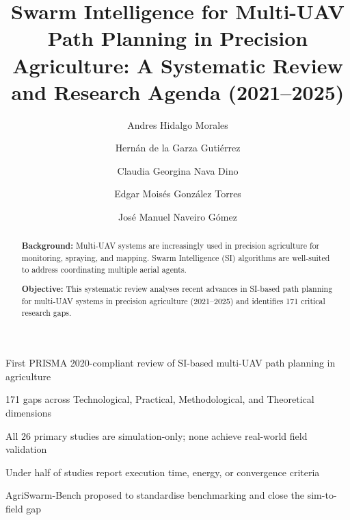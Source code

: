 \documentclass[review,3p,times]{elsarticle}
\begin{document}
\begin{frontmatter}
\title{Swarm Intelligence for Multi-UAV Path Planning in Precision Agriculture: A Systematic Review and Research Agenda (2021--2025)}

\author{\texorpdfstring{Andres Hidalgo Morales}{Andres Hidalgo Morales}}

\author{\texorpdfstring{Hernán de la Garza Gutiérrez}{Hernán de la Garza Gutiérrez}}
\author{\texorpdfstring{Claudia Georgina Nava Dino}{Claudia Georgina Nava Dino}}
\author{\texorpdfstring{Edgar Moisés González Torres}{Edgar Moisés González Torres}}
\author{\texorpdfstring{José Manuel Naveiro Gómez}{José Manuel Naveiro Gómez}}

\address[1]{Instituto Tecnológico de Chihuahua II, Tecnológico Nacional de México, Chihuahua, México}
\address[2]{Universidad Politécnica de Chihuahua, Chihuahua, México}
\address[3]{Facultad de Ingeniería, Universidad Autónoma de Chihuahua, Chihuahua, México}
\address[4]{Departamento de Ingeniería Mecánica, Universidad de Zaragoza, Zaragoza, España}

\begin{highlights}
\item First PRISMA 2020-compliant review of SI-based multi-UAV path planning in agriculture
\item 171 gaps across Technological, Practical, Methodological, and Theoretical dimensions
\item All 26 primary studies are simulation-only; none achieve real-world field validation
\item Under half of studies report execution time, energy, or convergence criteria
\item AgriSwarm-Bench proposed to standardise benchmarking and close the sim-to-field gap
\end{highlights}

\begin{abstract}
\textbf{Background:} Multi-UAV systems are increasingly used in precision agriculture for monitoring, spraying, and mapping. Swarm Intelligence (SI) algorithms are well-suited to address coordinating multiple aerial agents.

\textbf{Objective:} This systematic review analyses recent advances in SI-based path planning for multi-UAV systems in precision agriculture (2021--2025) and identifies 171 critical research gaps.


\end{abstract}
\end{frontmatter}
\end{document}
